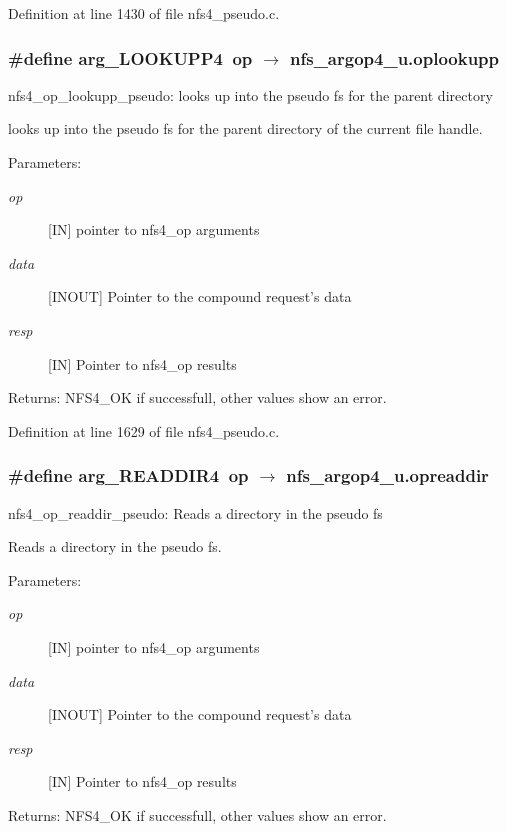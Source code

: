 Definition at line 1430 of file nfs4\_\-pseudo.c.
\subsubsection{\setlength{\rightskip}{0pt plus 5cm}\#define arg\_\-LOOKUPP4\ op $\rightarrow$ nfs\_\-argop4\_\-u.oplookupp}\label{nfs4__pseudo_8c_a9}


nfs4\_\-op\_\-lookupp\_\-pseudo: looks up into the pseudo fs for the parent directory

looks up into the pseudo fs for the parent directory of the current file handle.

\begin{Desc}
\item[Parameters:]
\begin{description}
\item[{\em op}][IN] pointer to nfs4\_\-op arguments \item[{\em data}][INOUT] Pointer to the compound request's data \item[{\em resp}][IN] Pointer to nfs4\_\-op results\end{description}
\end{Desc}
\begin{Desc}
\item[Returns:]NFS4\_\-OK if successfull, other values show an error. \end{Desc}


Definition at line 1629 of file nfs4\_\-pseudo.c.
\subsubsection{\setlength{\rightskip}{0pt plus 5cm}\#define arg\_\-READDIR4\ op $\rightarrow$ nfs\_\-argop4\_\-u.opreaddir}\label{nfs4__pseudo_8c_a11}


nfs4\_\-op\_\-readdir\_\-pseudo: Reads a directory in the pseudo fs

Reads a directory in the pseudo fs.

\begin{Desc}
\item[Parameters:]
\begin{description}
\item[{\em op}][IN] pointer to nfs4\_\-op arguments \item[{\em data}][INOUT] Pointer to the compound request's data \item[{\em resp}][IN] Pointer to nfs4\_\-op results\end{description}
\end{Desc}
\begin{Desc}
\item[Returns:]NFS4\_\-OK if successfull, other values show an error. \end{Desc}


